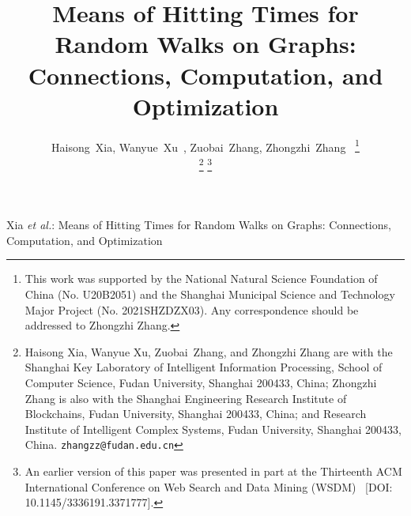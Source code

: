 \documentclass[10pt,twocolumn,twoside]{IEEEtran}
\begin{document}
\title{Means of Hitting Times for Random Walks on Graphs: Connections, Computation, and Optimization}
\author{Haisong~Xia,
    Wanyue~Xu~,
    Zuobai~Zhang,
    Zhongzhi~Zhang~
    \thanks{This work was  supported  by the National Natural Science Foundation of China (No. U20B2051) and the Shanghai Municipal Science and Technology
        Major Project  (No. 2021SHZDZX03). Any correspondence should be addressed to Zhongzhi Zhang.
    }


    \thanks{
        Haisong Xia, Wanyue Xu,  Zuobai~Zhang, and Zhongzhi Zhang are with the Shanghai Key Laboratory of Intelligent Information Processing, School of Computer Science, Fudan University, Shanghai 200433, China; Zhongzhi Zhang is also with the Shanghai Engineering Research Institute of Blockchains, Fudan University, Shanghai 200433, China; and Research
        Institute of Intelligent Complex Systems, Fudan University, Shanghai 200433, China. {\tt\small zhangzz@fudan.edu.cn}
    }
    \thanks{
        An earlier version of this paper was presented in part at the Thirteenth ACM International Conference on Web Search and Data Mining (WSDM)~\cite{ZhXuZh20} [DOI: 10.1145/3336191.3371777].
    }

}

{Xia \MakeLowercase{\textit{et al.}}: Means of Hitting Times for Random Walks on Graphs: Connections, Computation, and Optimization}
\end{document}

